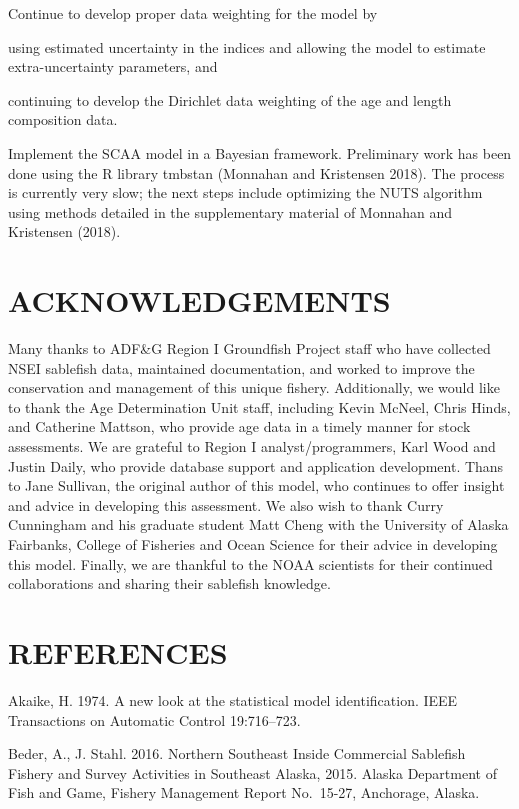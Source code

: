 \documentclass[
]{article}
\begin{document}
Continue to develop proper data weighting for the model by

using estimated uncertainty in the indices and allowing the model to
estimate extra-uncertainty parameters, and

continuing to develop the Dirichlet data weighting of the age and length
composition data.

Implement the SCAA model in a Bayesian framework. Preliminary work has
been done using the R library tmbstan (Monnahan and Kristensen 2018).
The process is currently very slow; the next steps include optimizing
the NUTS algorithm using methods detailed in the supplementary material
of Monnahan and Kristensen (2018).

\hypertarget{acknowledgements}{%
\section{ACKNOWLEDGEMENTS}\label{acknowledgements}}

Many thanks to ADF\&G Region I Groundfish Project staff who have
collected NSEI sablefish data, maintained documentation, and worked to
improve the conservation and management of this unique fishery.
Additionally, we would like to thank the Age Determination Unit staff,
including Kevin McNeel, Chris Hinds, and Catherine Mattson, who provide
age data in a timely manner for stock assessments. We are grateful to
Region I analyst/programmers, Karl Wood and Justin Daily, who provide
database support and application development. Thans to Jane Sullivan,
the original author of this model, who continues to offer insight and
advice in developing this assessment. We also wish to thank Curry
Cunningham and his graduate student Matt Cheng with the University of
Alaska Fairbanks, College of Fisheries and Ocean Science for their
advice in developing this model. Finally, we are thankful to the NOAA
scientists for their continued collaborations and sharing their
sablefish knowledge.

\hypertarget{references}{%
\section{REFERENCES}\label{references}}

Akaike, H. 1974. A new look at the statistical model identification.
IEEE Transactions on Automatic Control 19:716--723.

Beder, A., J. Stahl. 2016. Northern Southeast Inside Commercial
Sablefish Fishery and Survey Activities in Southeast Alaska, 2015.
Alaska Department of Fish and Game, Fishery Management Report No.~15-27,
Anchorage, Alaska.
\end{document}
